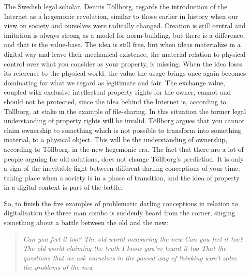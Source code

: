 The Swedish legal scholar, Dennis Töllborg, regards the introduction of the
Internet as a hegemonic revolution, similar to those earlier in history when our
view on society and ourselves were radically changed. Creation is still central
and imitation is always strong as a model for norm-building, but there is a
dif\hbox{}ference, and that is the value-base. The idea is still free, but when ideas
materialize in a digital way and leave their mechanical existence, the material
relation to physical control over what you consider as your property, is
missing. When the idea loses its reference to the physical world, the value the
usage brings once again becomes dominating for what we regard as legitimate and
fair. The exchange value, coupled with exclusive intellectual property rights
for the owner, cannot and should not be protected, since the idea behind the
Internet is, according to Töllborg, at stake in the example of f\hbox{}ile-sharing. In
this situation the former legal understanding of property rights will be
invalid. Töllborg argues that you cannot claim ownership to something which is
not possible to transform into something material, to a physical object. This
will be the understanding of ownership, according to Töllborg, in the new
hegemonic era\cite{darling-tollborg08}. The fact that there are a lot of people
arguing for old solutions, does not change Töllborg's prediction. It is only a
sign of the inevitable f\hbox{}ight between dif\hbox{}ferent darling conceptions of your time,
taking place when a society is in a phase of transition, and the idea of
property in a digital context is part of the battle.

So, to f\hbox{}inish the f\hbox{}ive examples of problematic darling conceptions in relation
to digitalisation the three man combo is suddenly heard from the corner, singing
something about a battle between the old and the new:

\begin{quote}
\textit{Can you feel it too?}\newline
\textit{The old world measuring the new}\newline
\textit{Can you feel it too?}\newline
\textit{The old world claiming the truth}\newline
\newline
\textit{I know you've heard it too}\newline
\textit{That the questions that we ask ourselves}\newline
\textit{in the passed way of thinking}\newline
\textit{won't solve the problems of the new}
\end{quote}


